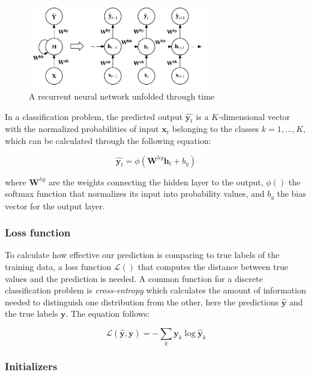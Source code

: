 \documentclass{kththesis}
\begin{document}
\begin{figure}[h]
    \centering
    \includegraphics[width=0.7\textwidth,keepaspectratio]{figures/rnn.pdf}
    \caption{A recurrent neural network unfolded through time}
    \label{fig:rnn}
\end{figure}

In a classification problem, the predicted output $\hat{\mathbf{y}_t}$ is a $K$-dimensional vector with the normalized probabilities of input $\mathbf{x}_t$ belonging to the classes $k=1,...,K$, which can be calculated through the following equation:

\begin{equation}
\hat{\mathbf{y}_t} = \phi(\mathbf{W}^{hy}\mathbf{h}_t + b_y)
\end{equation}

where $\mathbf{W}^{hy}$ are the weights connecting the hidden layer to the output, $\phi()$ the softmax function that normalizes its input into probability values, and $b_y$ the bias vector for the output layer. 

\subsubsection{Loss function}

To calculate how effective our prediction is comparing to true labels of the training data, a loss function $\mathcal{L}()$ that computes the distance between true values and the prediction is needed. A common function for a discrete classification problem is \emph{cross-entropy} which calculates the amount of information needed to distinguish one distribution from the other\citep{buja2005loss}, here the predictions $\hat{\mathbf{y}}$ and the true labels $\mathbf{y}$. The equation follows:

\begin{equation}
\mathcal{L}(\hat{\mathbf{y}}, \mathbf{y}) = - \sum_k \mathbf{y}_k \log \hat{\mathbf{y}}_k
\end{equation}

\subsubsection{Initializers}
\end{document}
